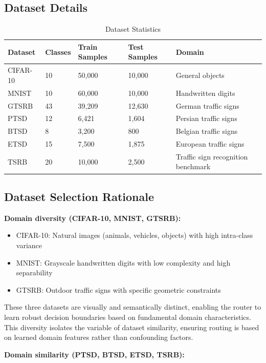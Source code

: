 \documentclass[11pt,a4paper]{article}
\begin{document}
\subsection{Dataset Details}

\begin{table}[H]
\centering
\small
\begin{tabular}{lllll}
\toprule
\textbf{Dataset} & \textbf{Classes} & \textbf{Train Samples} & \textbf{Test Samples} & \textbf{Domain} \\
\midrule
CIFAR-10 & 10 & 50,000 & 10,000 & General objects \\
MNIST & 10 & 60,000 & 10,000 & Handwritten digits \\
GTSRB & 43 & 39,209 & 12,630 & German traffic signs \\
PTSD & 12 & 6,421 & 1,604 & Persian traffic signs \\
BTSD & 8 & 3,200 & 800 & Belgian traffic signs \\
ETSD & 15 & 7,500 & 1,875 & European traffic signs \\
TSRB & 20 & 10,000 & 2,500 & Traffic sign recognition benchmark \\
\bottomrule
\end{tabular}
\caption{Dataset Statistics}
\end{table}

\subsection{Dataset Selection Rationale}

\textbf{Domain diversity (CIFAR-10, MNIST, GTSRB):}
\begin{itemize}
    \item CIFAR-10: Natural images (animals, vehicles, objects) with high intra-class variance
    \item MNIST: Grayscale handwritten digits with low complexity and high separability
    \item GTSRB: Outdoor traffic signs with specific geometric constraints
\end{itemize}

These three datasets are visually and semantically distinct, enabling the router to learn robust decision boundaries based on fundamental domain characteristics. This diversity isolates the variable of dataset similarity, ensuring routing is based on learned domain features rather than confounding factors.

\textbf{Domain similarity (PTSD, BTSD, ETSD, TSRB):}
\end{document}

